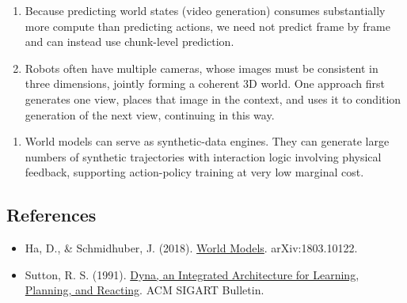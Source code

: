 \begin{enumerate}
\def\labelenumi{(\arabic{enumi})}
\item
  Because predicting world states (video generation) consumes substantially more compute than predicting actions, we need not predict frame by frame and can instead use chunk-level prediction.
\item
  Robots often have multiple cameras, whose images must be consistent in three dimensions, jointly forming a coherent 3D world. One approach first generates one view, places that image in the context, and uses it to condition generation of the next view, continuing in this way.
\end{enumerate}

\begin{enumerate}
\def\labelenumi{\arabic{enumi}.}
\setcounter{enumi}{2}
\tightlist
\item
  World models can serve as synthetic-data engines. They can generate large numbers of synthetic trajectories with interaction logic involving physical feedback, supporting action-policy training at very low marginal cost.
\end{enumerate}

\FloatBarrier
{}
\hypertarget{references-154}{%
\subsection{References}\label{references-154}}

\vspace{0.25em}
\begin{itemize}
\tightlist
\item
  Ha, D., \& Schmidhuber, J. (2018). \href{https://arxiv.org/abs/1803.10122}{World Models}. arXiv:1803.10122.
\item
  Sutton, R. S. (1991). \href{https://dl.acm.org/doi/10.1145/122344.122377}{Dyna, an Integrated Architecture for Learning, Planning, and Reacting}. ACM SIGART Bulletin.
\end{itemize}

\clearpage
